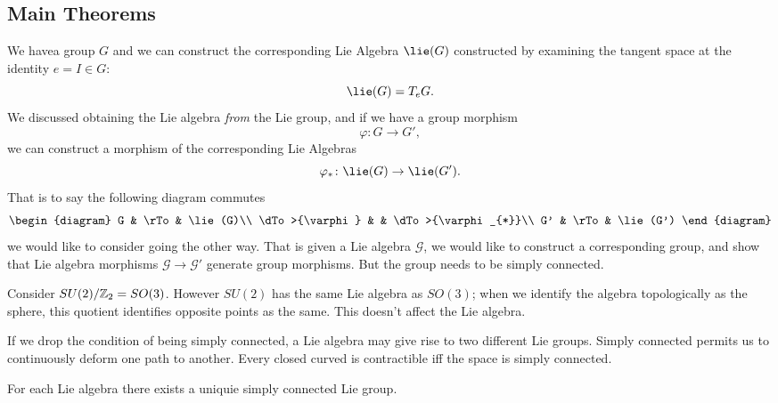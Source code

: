 \subsection{Main Theorems}
We havea group $G$ and we can construct the corresponding Lie
Algebra $\lie(G)$ constructed by examining the tangent space at
the identity $e=I\in G$:
\begin{equation}
\lie(G)=T_{e}G.
\end{equation}
We discussed obtaining the Lie algebra \emph{from} the Lie group,
and if we have a group morphism
\begin{equation}
\varphi\colon G\to G',
\end{equation}
we can construct a morphism of the corresponding Lie Algebras
\begin{equation}
\varphi_{*}\colon \lie(G)\to\lie(G').
\end{equation}
That is to say the following diagram commutes
\begin{equation}
\begin{diagram}
G              & \rTo & \lie(G)\\
\dTo>{\varphi} &      & \dTo>{\varphi_{*}}\\
G'             & \rTo & \lie(G')
\end{diagram}
\end{equation}
we would like to consider going the other way. That is given a
Lie algebra $\mathscr{G}$, we would like to construct a
corresponding group, and show that Lie algebra morphisms
$\mathscr{G}\to\mathscr{G}'$ generate group morphisms. But  the
group needs to be simply connected.

Consider $SU(2)/\Bbb{Z}_{2}=SO(3)$. However $SU(2)$ has the same
Lie algebra as $SO(3)$; when we identify the algebra
topologically as the sphere, this quotient identifies opposite
points as the same. This doesn't affect the Lie algebra.

If we drop the condition of being simply connected, a Lie algebra
may give rise to two different Lie groups. Simply connected
permits us to continuously deform one path to another. Every
closed curved is contractible iff the space is simply connected.

\begin{thm}
For each Lie algebra there exists a uniquie simply connected Lie group.
\end{thm}

